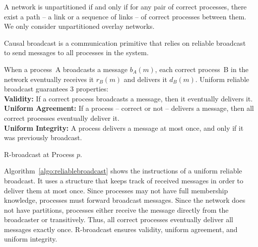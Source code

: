 
\begin{definition}
  A network is unpartitioned if and only if for any pair of correct processes,
  there exist a path -- a link or a sequence of links -- of correct processes
  between them. We only consider unpartitioned overlay networks.
\end{definition}

Causal broadcast is a communication primitive that relies on reliable broadcast
to send messages to all processes in the system.


\begin{definition}
  When a process~A broadcasts a message $b_A(m)$, each correct process~B in the
  network eventually receives it $r_B(m)$ and delivers it $d_B(m)$.
  Uniform reliable broadcast guarantees 3 properties: \\
  \textbf{Validity:} If a correct process broadcasts a message, then it
  eventually delivers it. \\
  \textbf{Uniform Agreement:} If a process -- correct or not -- delivers a
  message, then all correct processes eventually deliver it. \\
  \textbf{Uniform Integrity:} A process delivers a message at most once, and
  only if it was previously broadcast.
\end{definition}

\begin{algorithm}
  
  \caption{\label{algo:reliablebroadcast}R-broadcast at Process $p$.}
\end{algorithm}

Algorithm~\ref{algo:reliablebroadcast} shows the instructions of a uniform
reliable broadcast. It uses a structure that keeps track of received messages in
order to deliver them at most once.  Since processes may not have full
membership knowledge, processes must forward broadcast messages. Since the
network does not have partitions, processes either receive the message directly
from the broadcaster or transitively. Thus, all correct processes eventually
deliver all messages exactly once. R-broadcast ensures validity, uniform
agreement, and uniform integrity.

